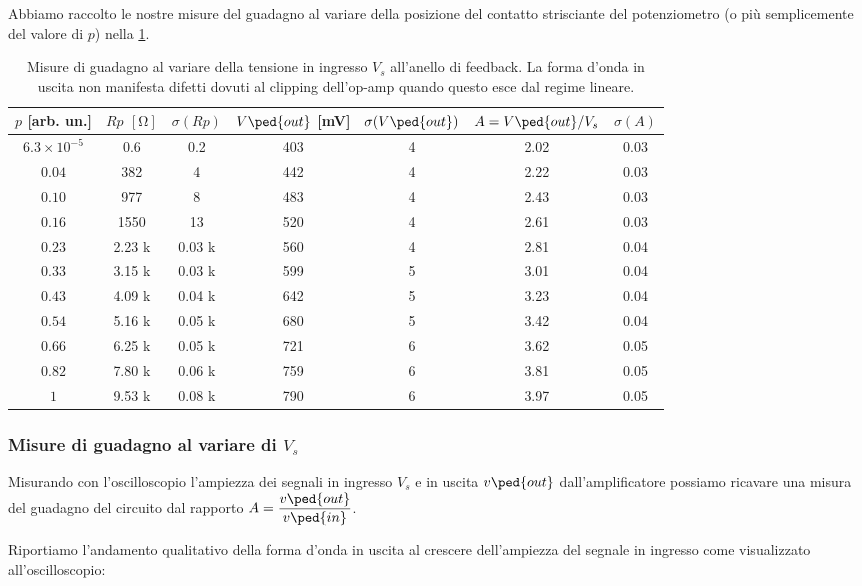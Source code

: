 \documentclass[10pt, a4paper, italian]{article}
\begin{document}
Abbiamo raccolto le nostre misure del guadagno al variare della posizione del
contatto strisciante del potenziometro (o più semplicemente del valore di $p$)
nella \cref{tab: VoutRp}.
\begin{table}[htbp]
\centering
\begin{tabular}{ccccccc}
\toprule
$p$ [arb. un.] & $Rp$ $[\si{\ohm}]$ & $\sigma(Rp)$ & $V\ped{out}$ [mV] &
$\sigma(V\ped{out})$ & $A = V\ped{out}/V_s$ & $\sigma(A)$ \\
\midrule
\midrule
$6.3 \times 10^{-5}$  	& 0.6     & 0.2 	& 403        & 4 & 2.02 & 0.03	\\
$0.04$   				& 382     & 4 		& 442        & 4 & 2.22	& 0.03	\\
$0.10$   				& 977     & 8 		& 483        & 4 & 2.43 & 0.03	\\
$0.16$   				& 1550    & 13 		& 520        & 4 & 2.61 & 0.03	\\
$0.23$   				& 2.23 k  & 0.03 k 	& 560        & 4 & 2.81 & 0.04	\\
$0.33$   				& 3.15 k  & 0.03 k	& 599        & 5 & 3.01 & 0.04	\\
$0.43$   				& 4.09 k  & 0.04 k	& 642        & 5 & 3.23 & 0.04	\\
$0.54$   				& 5.16 k  & 0.05 k	& 680        & 5 & 3.42 & 0.04	\\
$0.66$   				& 6.25 k  & 0.05 k	& 721        & 6 & 3.62 & 0.05	\\
$0.82$   				& 7.80 k  & 0.06 k	& 759        & 6 & 3.81 & 0.05	\\
$1$             		& 9.53 k  & 0.08 k	& 790        & 6 & 3.97 & 0.05	\\         
\bottomrule
\end{tabular}
\caption{Misure di guadagno al variare della tensione in ingresso $V_s$
all'anello di feedback. La forma d'onda in uscita non manifesta difetti
dovuti al clipping dell'op-amp quando questo esce dal regime lineare.
\label{tab: VoutRp}}
\end{table}

\subsubsection{Misure di guadagno al variare di $V_s$}
Misurando con l'oscilloscopio l'ampiezza dei segnali in ingresso $V_s$
e in uscita $v\ped{out}$ dall'amplificatore possiamo ricavare una misura del
guadagno del circuito dal rapporto $A = \dfrac{v\ped{out}}{v\ped{in}}$.

Riportiamo l'andamento qualitativo della forma d'onda in uscita al crescere
dell'ampiezza del segnale in ingresso come visualizzato all'oscilloscopio:
\end{document}
